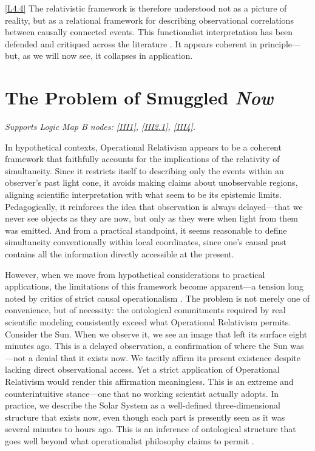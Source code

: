 \documentclass[12pt]{book}
\newcounter{logicanchor}
\newenvironment{logicanchorenv}[1]{\refstepcounter{logicanchor}\label{#1}}{}
\newcommand{\logiclink}[2]{\begin{logicanchorenv}{logic:#1}\end{logicanchorenv}\hyperref[appendix:#1]{[#1]}\xspace}
\begin{document}
\logiclink{L4.4}{} The relativistic framework is therefore understood not as a picture of reality, but as a relational framework for describing observational correlations between causally connected events. This functionalist interpretation has been defended and critiqued across the literature \citep{Salmon1969, Malament1977, vanFraassen1980, Earman1989}. It appears coherent in principle---but, as we will now see, it collapses in application.

\section{The Problem of Smuggled \textit{Now}}\label{sec:4.3}
\noindent\textit{Supports Logic Map B nodes: \hyperref[appendix:III1]{[III1]}, \hyperref[appendix:III2.1]{[III2.1]}, \hyperref[appendix:III4]{[III4]}.}

\vspace{4pt}

In hypothetical contexts, Operational Relativism appears to be a coherent framework that faithfully accounts for the implications of the relativity of simultaneity. Since it restricts itself to describing only the events within an observer's past light cone, it avoids making claims about unobservable regions, aligning scientific interpretation with what seem to be its epistemic limits. Pedagogically, it reinforces the idea that observation is always delayed---that we never see objects as they are now, but only as they were when light from them was emitted. And from a practical standpoint, it seems reasonable to define simultaneity conventionally within local coordinates, since one's causal past contains all the information directly accessible at the present.

However, when we move from hypothetical considerations to practical applications, the limitations of this framework become apparent---a tension long noted by critics of strict causal operationalism \citep{Salmon1969, Sklar1974}. The problem is not merely one of convenience, but of necessity: the ontological commitments required by real scientific modeling consistently exceed what Operational Relativism permits. Consider the Sun. When we observe it, we see an image that left its surface eight minutes ago. This is a delayed observation, a confirmation of where the Sun was---not a denial that it exists now. We tacitly affirm its present existence despite lacking direct observational access. Yet a strict application of Operational Relativism would render this affirmation meaningless. This is an extreme and counterintuitive stance---one that no working scientist actually adopts. In practice, we describe the Solar System as a well-defined three-dimensional structure that exists now, even though each part is presently seen as it was several minutes to hours ago. This is an inference of ontological structure that goes well beyond what operationalist philosophy claims to permit \citep[cf.][]{Maudlin2007}.
\end{document}
